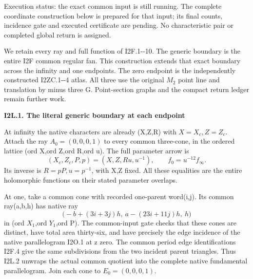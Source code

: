 Execution status: the exact common input is still running. The complete
coordinate construction below is prepared for that input; its final counts,
incidence gate and executed certificate are pending. No characteristic
pair or completed global return is assigned.

We retain every ray and full function of I2F.1-\/-10.
The generic boundary is the entire I2F common regular fan.
This construction extends that exact boundary across
the infinity and one endpoints. The zero endpoint
is the independently constructed I2ZC.1-\/-4 atlas.
All three use the original \(M_{2}\) point line and
translation by minus three G. Point-section graphs
and the compact return ledger remain further work.

\par

\medskip\noindent\textbf{I2L.1. The literal generic boundary at each endpoint}

\par\nobreak

At infinity the native characters are already
(X,Z,R) with \(X=X_c,Z=Z_c\). Attach the ray
\(A_{0}=(0,0,0,1)\) to every common three-cone, in the
ordered lattice (ord X,ord Z,ord R,ord u).
The full parameter arrow is
\[
 (X_c,Z_c,P,p)=(X,Z,Ru,u^{-1}),\qquad
 f_0=u^{-12}f_\infty.
 \tag{I2L.1}
\]
Its inverse is \(R=pP,u=p^{-1}\), with X,Z fixed.
All these equalities are the entire holomorphic
functions on their stated parameter overlaps.

At one, take a common cone with recorded one-parent
word(i,j). Its common ray(a,b,h) has native ray
\[
 \bigl(-b+(3i+3j)h,\ a-(23i+11j)h,\ h\bigr)
 \tag{I2L.2}
\]
in (ord \(X_{1}\),ord \(Y_{1}\),ord P). The common-input gate checks that these cones are
distinct, have total area thirty-six, and have
precisely the edge incidence of the native
parallelogram I2O.1 at z zero. The common period
edge identifications I2F.4 give the same
subdivisions from the two incident parent
triangles. Thus I2L.2 unwraps the actual common
quotient into the complete native fundamental
parallelogram. Join each cone to \(E_{0}=(0,0,0,1)\).

